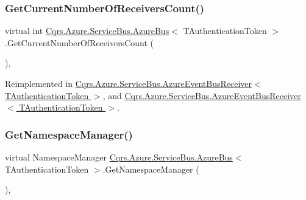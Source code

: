 \subsubsection{\texorpdfstring{Get\+Current\+Number\+Of\+Receivers\+Count()}{GetCurrentNumberOfReceiversCount()}}
{\footnotesize\ttfamily virtual int \hyperlink{classCqrs_1_1Azure_1_1ServiceBus_1_1AzureBus}{Cqrs.\+Azure.\+Service\+Bus.\+Azure\+Bus}$<$ T\+Authentication\+Token $>$.Get\+Current\+Number\+Of\+Receivers\+Count (\begin{DoxyParamCaption}{ }\end{DoxyParamCaption})\hspace{0.3cm}{\ttfamily [protected]}, {\ttfamily [virtual]}}



Reimplemented in \hyperlink{classCqrs_1_1Azure_1_1ServiceBus_1_1AzureEventBusReceiver_a153e44d4d94a6d812e3990cc2a417eed}{Cqrs.\+Azure.\+Service\+Bus.\+Azure\+Event\+Bus\+Receiver$<$ T\+Authentication\+Token $>$}, and \hyperlink{classCqrs_1_1Azure_1_1ServiceBus_1_1AzureEventBusReceiver_a153e44d4d94a6d812e3990cc2a417eed}{Cqrs.\+Azure.\+Service\+Bus.\+Azure\+Event\+Bus\+Receiver$<$ T\+Authentication\+Token $>$}.

\mbox{\label{classCqrs_1_1Azure_1_1ServiceBus_1_1AzureBus_ae7e6f920864cceec2850be9baac84803}} 
\subsubsection{\texorpdfstring{Get\+Namespace\+Manager()}{GetNamespaceManager()}}
{\footnotesize\ttfamily virtual Namespace\+Manager \hyperlink{classCqrs_1_1Azure_1_1ServiceBus_1_1AzureBus}{Cqrs.\+Azure.\+Service\+Bus.\+Azure\+Bus}$<$ T\+Authentication\+Token $>$.Get\+Namespace\+Manager (\begin{DoxyParamCaption}{ }\end{DoxyParamCaption})\hspace{0.3cm}{\ttfamily [protected]}, {\ttfamily [virtual]}}

\mbox{\label{classCqrs_1_1Azure_1_1ServiceBus_1_1AzureBus_a0bacaa4619921333da4a27371c1d6d0a}} 
